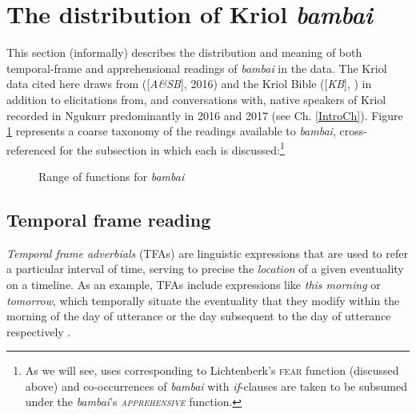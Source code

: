 \section{The distribution of Kriol \textit{bambai}}\reversemarginpar
This section (informally) describes the distribution and meaning of both temporal-frame and apprehensional readings of \textit{bambai} in the data.  The Kriol data cited here draws from \citeauthor{Angelo2016} ([\textit{A\&SB}], 2016) and the Kriol Bible ([\textit{KB}], \citealp{TheBibleSocietyinAustralia2007}) in addition to elicitations from, and conversations with, native speakers of Kriol recorded in Ngukurr predominantly in 2016 and 2017 (see Ch. \ref{IntroCh}). Figure \ref{bb-dist} represents a coarse taxonomy of the readings available to \textit{bambai}, cross-referenced for the subsection in which each is discussed:\footnote{As we will see, uses corresponding to Lichtenberk's \textsc{fear} function (discussed above) and co-occurrences of \textit{bambai} with \textit{if}-clauses are taken to be subsumed under the \textit{bambai}'s \textsc{\textit{apprehensive}} function.}

\begin{figure}[h]\caption{Range of functions for \textit{bambai}}\centering\label{bb-dist}
\end{figure}


	\subsection{Temporal frame reading}\label{dataStfa}
\textit{Temporal frame adverbials} (TFAs) are linguistic expressions that are used to refer a particular interval of time, serving to precise the \textit{location} of a given eventuality on a timeline. As an example, TFAs include expressions like \textit{this morning} or \textit{tomorrow}, which temporally situate the eventuality that they modify within the morning of the day of utterance or the day subsequent to the day of utterance respectively \citep[see][307]{Binnick1991}. 

